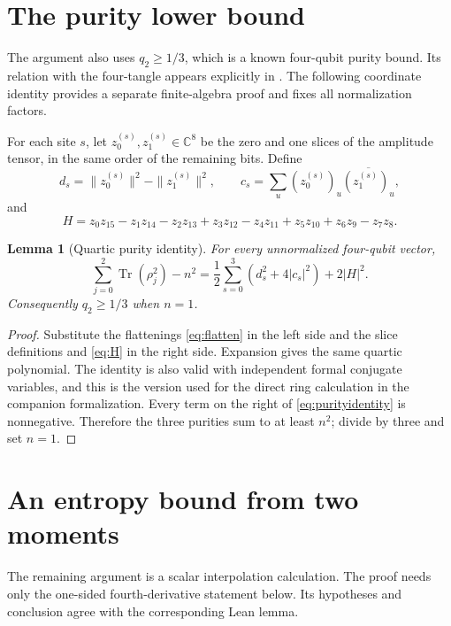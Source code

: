 \documentclass[11pt]{article}
\newtheorem{lemma}[theorem]{Lemma}
\theoremstyle{definition}
\theoremstyle{remark}
\DeclareMathOperator{\Tr}{Tr}
\newcommand{\C}{\mathbb C}
\newcommand{\conj}[1]{\overline{#1}}
\begin{document}
\section{The purity lower bound}

The argument also uses $q_2\geq1/3$, which is a known four-qubit
purity bound. Its relation with the four-tangle appears explicitly in
\cite[Theorem~6]{GW10}. The following coordinate identity provides a
separate finite-algebra proof and fixes all normalization factors.

For each site $s$, let $z^{(s)}_0,z^{(s)}_1\in\C^8$ be the zero and one
slices of the amplitude tensor, in the same order of the remaining bits.
Define
\[
 d_s=\|z^{(s)}_0\|^2-\|z^{(s)}_1\|^2,
 \qquad c_s=\sum_u (z^{(s)}_0)_u\conj{(z^{(s)}_1)_u},
\]
and
\begin{equation}
 H=z_0z_{15}-z_1z_{14}-z_2z_{13}+z_3z_{12}
       -z_4z_{11}+z_5z_{10}+z_6z_9-z_7z_8.
 \label{eq:H}
\end{equation}

\begin{lemma}[Quartic purity identity]
\label{lem:purity}
For every unnormalized four-qubit vector,
\begin{equation}
 \sum_{j=0}^2\Tr(\rho_j^2)-n^2
 =\frac12\sum_{s=0}^3(d_s^2+4|c_s|^2)+2|H|^2.
 \label{eq:purityidentity}
\end{equation}
Consequently $q_2\geq1/3$ when $n=1$.
\end{lemma}
\begin{proof}
Substitute the flattenings \eqref{eq:flatten} in the left side and the
slice definitions and \eqref{eq:H} in the right side. Expansion gives the
same quartic polynomial. The identity is also valid with independent
formal conjugate variables, and this is the version used for the direct
ring calculation in the companion formalization. Every term on the right
of \eqref{eq:purityidentity} is nonnegative. Therefore the three purities
sum to at least $n^2$; divide by three and set $n=1$.
\end{proof}

\section{An entropy bound from two moments}

The remaining argument is a scalar interpolation calculation. The proof needs only the one-sided fourth-derivative statement below. Its hypotheses
and conclusion agree with the corresponding Lean lemma.
\end{document}
